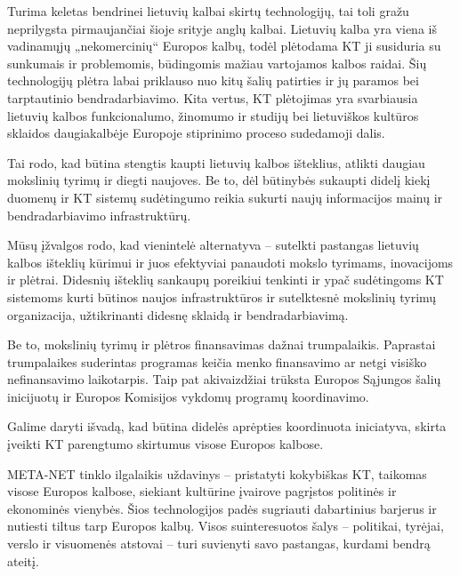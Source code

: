\begin{multicols}{2}
    Turima keletas bendrinei lietuvių kalbai skirtų technologijų, tai toli gražu neprilygsta pirmaujančiai šioje srityje anglų kalbai. Lietuvių kalba yra viena iš vadinamųjų „nekomercinių“ Europos kalbų, todėl plėtodama KT ji susiduria su sunkumais ir problemomis, būdingomis mažiau vartojamos kalbos raidai. Šių technologijų plėtra labai priklauso nuo kitų šalių patirties ir jų paramos bei tarptautinio bendradarbiavimo. Kita vertus, KT plėtojimas yra svarbiausia lietuvių kalbos funkcionalumo, žinomumo ir studijų bei lietuviškos kultūros sklaidos daugiakalbėje Europoje stiprinimo proceso sudedamoji dalis.   

    Tai rodo, kad būtina stengtis kaupti lietuvių kalbos išteklius, atlikti daugiau mokslinių tyrimų ir diegti naujoves. Be to, dėl būtinybės sukaupti didelį kiekį duomenų ir KT sistemų sudėtingumo reikia sukurti naujų informacijos mainų ir bendradarbiavimo infrastruktūrų.   

Mūsų įžvalgos rodo, kad vienintelė alternatyva – sutelkti pastangas lietuvių kalbos išteklių kūrimui ir juos efektyviai panaudoti mokslo tyrimams, inovacijoms ir plėtrai. Didesnių išteklių sankaupų poreikiui tenkinti ir ypač sudėtingoms KT sistemoms kurti būtinos naujos infrastruktūros ir sutelktesnė mokslinių tyrimų organizacija, užtikrinanti didesnę sklaidą ir bendradarbiavimą.

    Be to, mokslinių tyrimų ir plėtros finansavimas dažnai trumpalaikis. Paprastai trumpalaikes suderintas programas keičia menko finansavimo ar  netgi visiško nefinansavimo laikotarpis. Taip pat akivaizdžiai trūksta Europos Sąjungos šalių inicijuotų ir Europos Komisijos vykdomų programų koordinavimo.   

    Galime daryti išvadą, kad būtina didelės aprėpties koordinuota iniciatyva, skirta įveikti KT parengtumo skirtumus  visose Europos kalbose.

META-NET tinklo ilgalaikis uždavinys – pristatyti kokybiškas KT, taikomas visose Europos kalbose, siekiant kultūrine įvairove pagrįstos politinės ir ekonominės vienybės. Šios technologijos padės sugriauti dabartinius barjerus ir nutiesti tiltus tarp Europos kalbų. Visos suinteresuotos šalys – politikai, tyrėjai, verslo ir visuomenės atstovai – turi suvienyti savo pastangas, kurdami bendrą ateitį. 
\end{multicols}

\cleardoublepage



